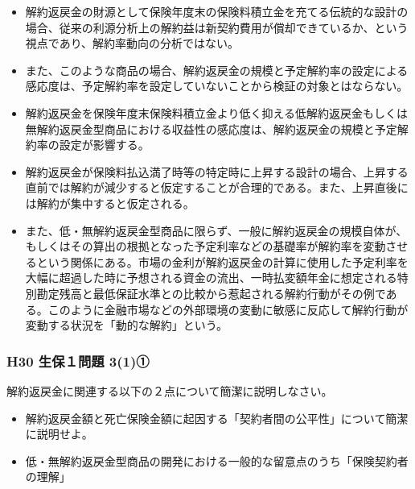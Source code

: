\documentclass[report,gutter=10mm,fore-edge=10mm,uplatex,dvipdfmx]{jlreq}
\begin{document}
\begin{enumerate}
\begin{itemize}
      \item 解約返戻金の財源として保険年度末の保険料積立金を充てる伝統的な設計の場合、従来の利源分析上の解約益は新契約費用が償却できているか、という視点であり、解約率動向の分析ではない。
      \item また、このような商品の場合、解約返戻金の規模と予定解約率の設定による感応度は、予定解約率を設定していないことから検証の対象とはならない。
      \item 解約返戻金を保険年度末保険料積立金より低く抑える低解約返戻金もしくは無解約返戻金型商品における収益性の感応度は、解約返戻金の規模と予定解約率の設定が影響する。
      \item 解約返戻金が保険料払込満了時等の特定時に上昇する設計の場合、上昇する直前では解約が減少すると仮定することが合理的である。また、上昇直後には解約が集中すると仮定される。
      \item また、低・無解約返戻金型商品に限らず、一般に解約返戻金の規模自体が、もしくはその算出の根拠となった予定利率などの基礎率が解約率を変動させるという関係にある。市場の金利が解約返戻金の計算に使用した予定利率を大幅に超過した時に予想される資金の流出、一時払変額年金に想定される特別勘定残高と最低保証水準との比較から惹起される解約行動がその例である。このように金融市場などの外部環境の変動に敏感に反応して解約行動が変動する状況を「動的な解約」という。
    \end{itemize}
  \end{enumerate}
\subsubsection{H30 生保１問題 3(1)①}
  解約返戻金に関連する以下の２点について簡潔に説明しなさい。
  \begin{itemize}
    \item 解約返戻金額と死亡保険金額に起因する「契約者間の公平性」について簡潔に説明せよ。
    \item 低・無解約返戻金型商品の開発における一般的な留意点のうち「保険契約者の理解」
  \end{itemize}
  
\end{document}
